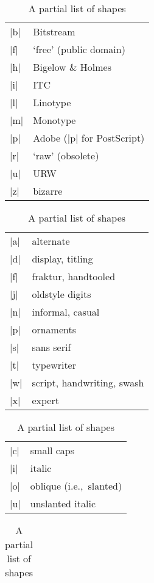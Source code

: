 \documentclass[a4paper]{ltxguide}
\newcommand{\PS}{Post\-Script\xspace}
\begin{document}
\begin{table}[!t]
\begin{minipage}{0.5\textwidth}
  \small
  \begin{tabular}{ll}
    |b| & Bitstream             \\
    |f| & `free' (public domain) \\
    |h| & Bigelow \& Holmes     \\
    |i| & ITC                   \\
    |l| & Linotype              \\
    |m| & Monotype              \\
    |p| & Adobe (|p| for \PS)   \\
    |r| & `raw' (obsolete)      \\
    |u| & URW                   \\
    |z| & bizarre
  \end{tabular}
  \caption{A partial list of foundries}
  \label{Tab:foundry}
  \begin{tabular}{ll}
    |a| & alternate             \\
    |d| & display, titling      \\
    |f| & fraktur, handtooled   \\
    |j| & oldstyle digits       \\
    |n| & informal, casual      \\
    |p| & ornaments             \\
    |s| & sans serif            \\
    |t| & typewriter            \\
    |w| & script, handwriting, swash \\
    |x| & expert                \\
  \end{tabular}
  \caption{A partial list of variants}
  \label{Tab:variant}
  \begin{tabular}{ll}
    |c| & small caps            \\
    |i| & italic                \\
    |o| & oblique (i.e.,~slanted) \\
    |u| & unslanted italic      \\
  \end{tabular}
  \caption{A partial list of shapes}
  \label{Tab:shape}
\end{minipage}
\begin{minipage}{0.5\textwidth}
  \small
  \begin{tabular}{ll}

\end{tabular}
\end{minipage}
\end{table}
\end{document}
